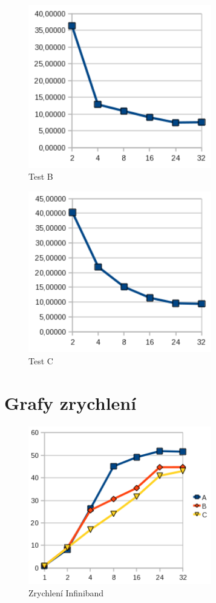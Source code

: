 \documentclass[12pt]{article}
\begin{document}
\begin{figure}[h]
\begin{center}
\includegraphics[width=8cm]{grafy-zprava/testBeth.png}
\caption{Test B}
\label{fig:testBether}
\end{center}
\end{figure}

\begin{figure}[h]
\begin{center}
\includegraphics[width=8cm]{grafy-zprava/testCeth.png}
\caption{Test C}
\label{fig:testCether}
\end{center}
\end{figure}

\section{Grafy zrychlení}
\begin{figure}[h]
\begin{center}
\includegraphics[width=8cm]{grafy-zprava/zrychleniinf.png}
\caption{Zrychlení Infiniband}
\label{fig:zrychleniinf}
\end{center}
\end{figure}
\end{document}
